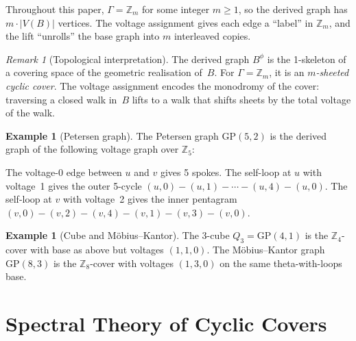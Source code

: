 \documentclass[11pt,a4paper]{article}
\theoremstyle{plain}
\theoremstyle{definition}
\newtheorem{example}[theorem]{Example}
\theoremstyle{remark}
\newtheorem{remark}[theorem]{Remark}
\newcommand{\Z}{\mathbb{Z}}
\newcommand{\GP}{\mathrm{GP}}
\begin{document}
Throughout this paper, $\Gamma = \Z_m$ for some integer $m \ge 1$, so the
derived graph has $m \cdot |V(B)|$ vertices. The voltage assignment gives
each edge a ``label'' in $\Z_m$, and the lift ``unrolls'' the base graph
into $m$ interleaved copies.

\begin{remark}[Topological interpretation]
The derived graph $B^\phi$ is the 1-skeleton of a covering space of the
geometric realisation of~$B$. For $\Gamma = \Z_m$, it is an \emph{$m$-sheeted
cyclic cover}. The voltage assignment encodes the monodromy of the cover:
traversing a closed walk in~$B$ lifts to a walk that shifts sheets by the
total voltage of the walk.
\end{remark}

\begin{example}[Petersen graph]
The Petersen graph $\GP(5,2)$ is the derived graph of the following voltage
graph over $\Z_5$:
\begin{center}
\end{center}
The voltage-0 edge between $u$ and $v$ gives 5 spokes. The self-loop at $u$
with voltage~1 gives the outer 5-cycle $(u,0)-(u,1)-\cdots-(u,4)-(u,0)$.
The self-loop at $v$ with voltage~2 gives the inner pentagram
$(v,0)-(v,2)-(v,4)-(v,1)-(v,3)-(v,0)$.
\end{example}

\begin{example}[Cube and Möbius--Kantor]
The 3-cube $Q_3 = \GP(4,1)$ is the $\Z_4$-cover with base as above but
voltages $(1, 1, 0)$. The Möbius--Kantor graph $\GP(8,3)$ is the $\Z_8$-cover
with voltages $(1, 3, 0)$ on the same theta-with-loops base.
\end{example}


\section{Spectral Theory of Cyclic Covers}
\label{sec:spectrum}
\end{document}
